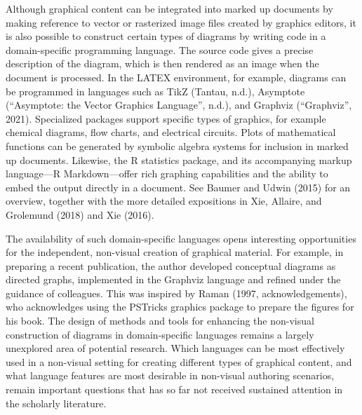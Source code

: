 \documentclass[11pt]{sig-alternate}
\begin{document}
\begin{large}
Although graphical content can be integrated into marked up documents by making reference to vector or rasterized image files created by graphics editors, it is also possible to construct certain types of diagrams by writing code in a domain-specific programming language. The source code gives a precise description of the diagram, which is then rendered as an image when the document is processed. In the LATEX environment, for example, diagrams can be programmed in languages such as TikZ (Tantau, n.d.), Asymptote (“Asymptote: the Vector Graphics Language”, n.d.), and Graphviz (“Graphviz”, 2021). Specialized packages support specific types of graphics, for example chemical diagrams, flow charts, and electrical circuits. Plots of mathematical functions can be generated by symbolic algebra systems for inclusion in marked up documents. Likewise, the R statistics package, and its accompanying mark\-up language—R Markdown—offer rich graphing capabilities and the ability to embed the output directly in a document. See Baumer and Udwin (2015) for an overview, together with the more detailed expositions in Xie, Allaire, and Grolemund (2018) and Xie (2016).

The availability of such domain-specific languages opens interesting opportunities for the independent, non-visual creation of graphical material. For example, in preparing a recent publication, the author developed conceptual diagrams as directed graphs, implemented in the Graphviz language and refined under the guidance of colleagues. This was inspired by Raman (1997, acknowledgements), who acknowledges using the PSTricks graphics package to prepare the figures for his book. The design of methods and tools for enhancing the non-visual construction of diagrams in domain-specific languages remains a largely unexplored area of potential research. Which languages can be most effectively used in a non-visual setting for creating different types of graphical content, and what language features are most desirable in non-visual authoring scenarios, remain important questions that has so far not received sustained attention in the scholarly literature.


\end{large}
\end{document}
